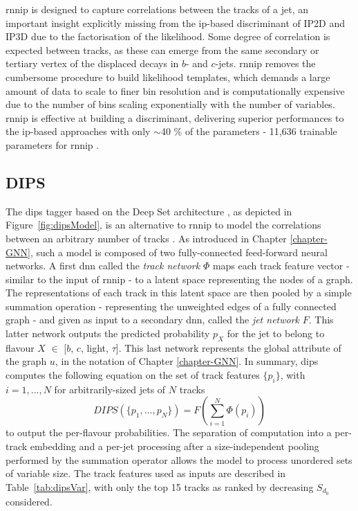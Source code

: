 \gls{rnnip} is designed to capture correlations between the tracks of a jet, an important insight explicitly missing from the \gls{ip}-based discriminant of IP2D and IP3D due to the factorisation of the likelihood. Some degree of correlation is expected between tracks, as these can emerge from the same secondary or tertiary vertex of the displaced decays in $b$- and $c$-jets. \gls{rnnip} removes the cumbersome procedure to build likelihood templates, which demands a large amount of data to scale to finer bin resolution and is computationally expensive due to the number of bins scaling exponentially with the number of variables. \gls{rnnip} is effective at building a discriminant, delivering superior performances to the \gls{ip}-based approaches with only $\sim$40 \% of the parameters - 11,636 trainable parameters for \gls{rnnip} \cite{Paganini:2289214}.

\subsection{DIPS}
The \gls{dips} tagger based on the Deep Set architecture \cite{NIPS2017f22e4747}, as depicted in Figure~\ref{fig:dipsModel}, is an alternative to \gls{rnnip} to model the correlations between an arbitrary number of tracks \cite{ATL-PHYS-PUB-2020-014}. As introduced in Chapter \ref{chapter-GNN}, such a model is composed of two fully-connected feed-forward neural networks. A first \gls{dnn} called the \textit{track network} $\Phi$ maps each track feature vector - similar to the input of \gls{rnnip} - to a latent space representing the nodes of a graph. The representations of each track in this latent space are then pooled by a simple summation operation - representing the unweighted edges of a fully connected graph - and given as input to a secondary \gls{dnn}, called the \textit{jet network} $F$. This latter network outputs the predicted probability $p_X$ for the jet to belong to flavour $X$ $\in$ [$b$, $c$, light, $\tau$]. This last network represents the global attribute of the graph $u$, in the notation of Chapter \ref{chapter-GNN}. 
In summary, \gls{dips} computes the following equation on the set of track features $\{ p_i \}$, with $i = 1, ..., N$ for arbitrarily-sized jets of $N$ tracks
\begin{equation}
  DIPS( \{p_1, ..., p_N \} ) = F\left( \sum_{i=1}^N \Phi(p_i) \right)
\end{equation}
to output the per-flavour probabilities. The separation of computation into a per-track embedding and a per-jet processing after a size-independent pooling performed by the summation operator allows the model to process unordered sets of variable size. The track features used as inputs are described in Table~\ref{tab:dipsVar}, with only the top 15 tracks as ranked by decreasing $S_{d_0}$ considered. \\

